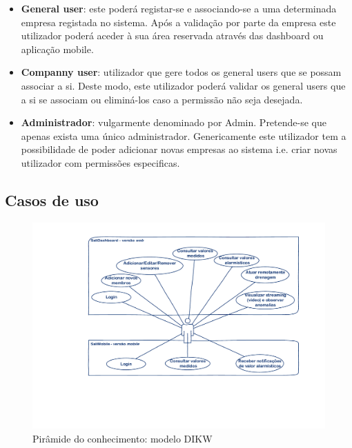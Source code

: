 \begin{itemize}
	
	\item \textbf{General user}: este poderá registar-se e associando-se a uma determinada empresa registada no sistema. Após a validação por parte da empresa este utilizador poderá aceder à sua área reservada através das dashboard ou aplicação mobile. 
	
	\item \textbf{Companny user}: utilizador que gere todos os general users que se possam associar a si. Deste modo, este utilizador poderá validar os general users que a si se associam ou eliminá-los caso a permissão não seja desejada.  
	
	\item \textbf{Administrador}: vulgarmente denominado por Admin. Pretende-se que apenas exista uma único administrador. Genericamente este utilizador tem a possibilidade de poder adicionar novas empresas ao sistema i.e. criar novas utilizador com permissões especificas. 
	
\end{itemize}



\newpage

\subsection{Casos de uso}


\begin{figure}[!htb]
	\centering
	\includegraphics[scale=0.5]{esquemas/usecases.pdf}
	\caption{Pirâmide do conhecimento: modelo DIKW}
	\label{dikw}
\end{figure}











